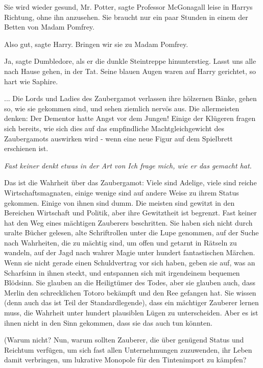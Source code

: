 \glqq{}Sie wird wieder gesund, Mr. Potter\grqq{}, sagte Professor McGonagall
leise in Harrys Richtung, ohne ihn anzusehen. \glqq{}Sie braucht nur ein paar
Stunden in einem der Betten von Madam Pomfrey.\grqq{}

\glqq{}Also gut\grqq{}, sagte Harry. \glqq{}Bringen wir sie zu Madam
Pomfrey.\grqq{}

\glqq{}Ja\grqq{}, sagte Dumbledore, als er die dunkle Steintreppe hinunterstieg.
\glqq{}Lasst uns alle nach Hause gehen, in der Tat.\grqq{} Seine blauen Augen
waren auf Harry gerichtet, so hart wie Saphire.

... Die Lords und Ladies des Zaubergamot verlassen ihre hölzernen Bänke, gehen
so, wie sie gekommen sind, und sehen ziemlich nervös aus. Die allermeisten
denken: \glqq{}Der Dementor hatte Angst vor dem Jungen!\grqq{} Einige der
Klügeren fragen sich bereits, wie sich dies auf das empfindliche
Machtgleichgewicht des Zaubergamots auswirken wird - wenn eine neue Figur auf
dem Spielbrett erschienen ist.

\emph{Fast keiner denkt etwas in der Art von \glqq{}Ich frage mich, wie er das
gemacht hat.\grqq{}}

Das ist die Wahrheit über das Zaubergamot: Viele sind Adelige, viele sind reiche
Wirtschaftsmagnaten, einige wenige sind auf andere Weise zu ihrem Status
gekommen. Einige von ihnen sind dumm. Die meisten sind gewitzt in den Bereichen
Wirtschaft und Politik, aber ihre Gewitztheit ist begrenzt. Fast keiner hat den
Weg eines mächtigen Zauberers beschritten. Sie haben sich nicht durch uralte
Bücher gelesen, alte Schriftrollen unter die Lupe genommen, auf der Suche nach
Wahrheiten, die zu mächtig sind, um offen und getarnt in Rätseln zu wandeln, auf
der Jagd nach wahrer Magie unter hundert fantastischen Märchen. Wenn sie nicht
gerade einen Schuldvertrag vor sich haben, geben sie auf, was an Scharfsinn in
ihnen steckt, und entspannen sich mit irgendeinem bequemen Blödsinn. Sie glauben
an die Heiligtümer des Todes, aber sie glauben auch, dass Merlin den
schrecklichen Totoro bekämpft und den Ree gefangen hat. Sie wissen (denn auch
das ist Teil der Standardlegende), dass ein mächtiger Zauberer lernen muss, die
Wahrheit unter hundert plausiblen Lügen zu unterscheiden. Aber es ist ihnen
nicht in den Sinn gekommen, dass sie das auch tun könnten.

(Warum nicht? Nun, warum sollten Zauberer, die über genügend Status und Reichtum
verfügen, um sich fast allen Unternehmungen zuzuwenden, ihr Leben damit
verbringen, um lukrative Monopole für den Tintenimport zu kämpfen?

